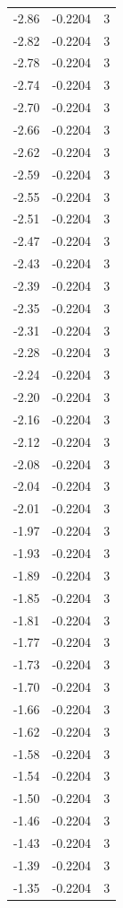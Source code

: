 \begin{longtable}{lrr}
  -2.86 & -0.2204 & 3 \\
  -2.82 & -0.2204 & 3 \\
  -2.78 & -0.2204 & 3 \\
  -2.74 & -0.2204 & 3 \\
  -2.70 & -0.2204 & 3 \\
  -2.66 & -0.2204 & 3 \\
  -2.62 & -0.2204 & 3 \\
  -2.59 & -0.2204 & 3 \\
  -2.55 & -0.2204 & 3 \\
  -2.51 & -0.2204 & 3 \\
  -2.47 & -0.2204 & 3 \\
  -2.43 & -0.2204 & 3 \\
  -2.39 & -0.2204 & 3 \\
  -2.35 & -0.2204 & 3 \\
  -2.31 & -0.2204 & 3 \\
  -2.28 & -0.2204 & 3 \\
  -2.24 & -0.2204 & 3 \\
  -2.20 & -0.2204 & 3 \\
  -2.16 & -0.2204 & 3 \\
  -2.12 & -0.2204 & 3 \\
  -2.08 & -0.2204 & 3 \\
  -2.04 & -0.2204 & 3 \\
  -2.01 & -0.2204 & 3 \\
  -1.97 & -0.2204 & 3 \\
  -1.93 & -0.2204 & 3 \\
  -1.89 & -0.2204 & 3 \\
  -1.85 & -0.2204 & 3 \\
  -1.81 & -0.2204 & 3 \\
  -1.77 & -0.2204 & 3 \\
  -1.73 & -0.2204 & 3 \\
  -1.70 & -0.2204 & 3 \\
  -1.66 & -0.2204 & 3 \\
  -1.62 & -0.2204 & 3 \\
  -1.58 & -0.2204 & 3 \\
  -1.54 & -0.2204 & 3 \\
  -1.50 & -0.2204 & 3 \\
  -1.46 & -0.2204 & 3 \\
  -1.43 & -0.2204 & 3 \\
  -1.39 & -0.2204 & 3 \\
  -1.35 & -0.2204 & 3 \\

\end{longtable}
